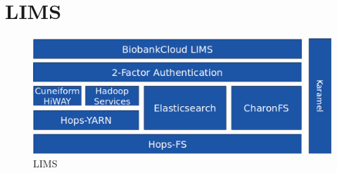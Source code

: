 \section{LIMS}

 \begin{figure}[h]
 \centering
 \includegraphics[width=\textwidth]{./imgs/stack.eps}
 \caption{LIMS}
 \label{fig:lim}
\end{figure}
